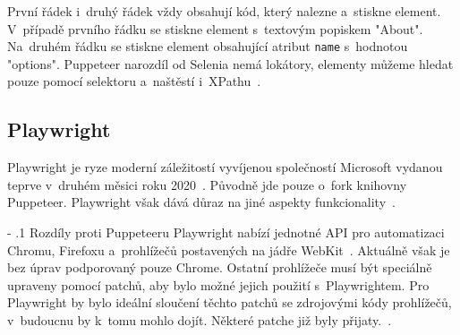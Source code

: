 \documentclass[12pt, a4paper, twoside]{article}
\makeatletter
\renewcommand\paragraph{%
	\@startsection{subparagraph}{5}{0mm}%
	{-\baselineskip}%
	{.1\baselineskip}%
	{\normalfont\normalsize\bfseries}}
\makeatother
\begin{document}
První řádek i~druhý řádek vždy obsahují kód, který nalezne a~stiskne element. V~případě prvního řádku se stiskne element s~textovým popiskem "About". Na~druhém řádku se stiskne element obsahující atribut \texttt{name} s~hodnotou "options". Puppeteer narozdíl od Selenia nemá lokátory, elementy můžeme hledat pouze pomocí selektoru a~naštěstí i~XPathu\label{text:puppeteerLocatorSupport}~\cite{puppeteerApi}.

	\newpage
	\subsection{Playwright}
	\label{sub_sec:Playwright}
	Playwright je ryze moderní záležitostí vyvíjenou společností Microsoft vydanou teprve v~druhém měsici roku 2020~\cite{playwrightFirstRelease}. Původně jde pouze o~fork knihovny Puppeteer. Playwright však dává důraz na jiné aspekty funkcionality~\cite{playwrightGithub}.
	
	\paragraph{Rozdíly proti Puppeteeru}
	Playwright nabízí jednotné API pro automatizaci Chromu, Firefoxu a~prohlížečů postavených na jádře WebKit~\cite{playwrightMainPage}. Aktuálně však je bez úprav podporovaný pouze Chrome. Ostatní prohlížeče musí být speciálně upraveny pomocí patchů, aby bylo možné jejich použití s~Playwrightem. Pro Playwright by bylo ideální sloučení těchto patchů se zdrojovými kódy prohlížečů, v~budoucnu by k~tomu mohlo dojít. Některé patche již byly přijaty.~\cite{playwrightBrowserPatches}.
	
\end{document}
